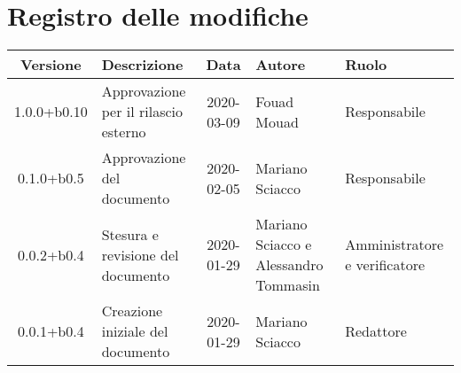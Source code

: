 \section*{Registro delle modifiche}

\begin{center}
	\begin{longtable}{|c|p{3.5cm}|c|p{3cm}|p{3cm}|}
	\hline
	\rowcolor{lighter-grayer}
	\textbf{Versione} & \textbf{Descrizione} & \textbf{Data} & \textbf{Autore} & \textbf{Ruolo} \\
	\hline
	\endfirsthead

	1.0.0+b0.10 & Approvazione per il rilascio esterno & 2020-03-09 & Fouad Mouad & Responsabile \\
	\hline
	0.1.0+b0.5 & Approvazione del documento & 2020-02-05 & Mariano Sciacco & Responsabile \\
	\hline
	0.0.2+b0.4 & Stesura e revisione del documento & 2020-01-29 & Mariano Sciacco e Alessandro Tommasin & Amministratore e verificatore \\
	\hline
	0.0.1+b0.4 & Creazione iniziale del documento & 2020-01-29 & Mariano Sciacco & Redattore \\
	\hline

	\end{longtable}
\end{center}
